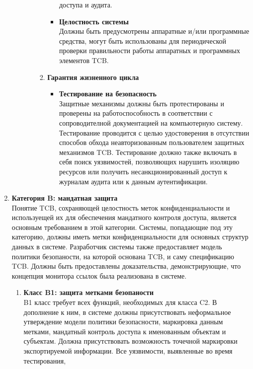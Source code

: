 \begin{enumerate}
\begin{enumerate}
\begin{enumerate}
\begin{enumerate}
\begin{itemize}
					доступа и аудита.
					\item{\textbf{Целостность системы}}\\
					Должны быть предусмотрены аппаратные и/или программные средства, могут быть использованы для периодической проверки правильности работы аппаратных и программных элементов TCB.
				\end{itemize}
				\item{\textbf{Гарантия жизненного цикла}}
				\begin{itemize}
					\item{\textbf{Тестирование на безопасность}}\\
					Защитные механизмы должны быть протестированы и проверены на работоспособность в соответствии с сопроводителной документацией на компьютерную систему.
					Тестирование проводится с целью удостоверения в отсутствии способов обхода неавторизованным пользователем защитных механизмов TCB. Тестирование должно также включать в себя
					поиск уязвимостей, позволяющих нарушить изоляцию ресурсов или получить несанкционированный доступ к журналам аудита или к данным аутентификации. 
				\end{itemize}
			\end{enumerate}
		\end{enumerate}
	\end{enumerate}
	\item{\textbf{Категория B: мандатная защита}}\\
	Понятие TCB, сохраняющей целостность меток конфиденциальности и используещей их для обеспечения мандатного контроля доступа, является основным требованием в этой категории. Системы, попадающие
	под эту категорию, должны иметь метки конфиденциальности для основных структур данных в системе. Разработчик системы также предоставляет модель политики безопаности, на которой основана TCB, и
	саму спецификацию TCB. Должны быть предоставлены доказательства, демонстрирующие, что концепция монитора ссылок была реализована в системе.  	 
	\begin{enumerate}
		\item{\textbf{Класс B1: защита метками безопаности}}\\
		B1 класс требует всех функций, необходимых для класса C2. В дополнение к ним, в системе должны присутствовать неформальное утверждение модели политики безопасности, маркировка данным метками,
		мандатный контроль доступа к именованным объектам и субъектам. Должна присутствовать возможность точечной маркировки экспортируемой информации. Все уязвимости, выявленные во время тестирования,

\end{enumerate}
\end{enumerate}
